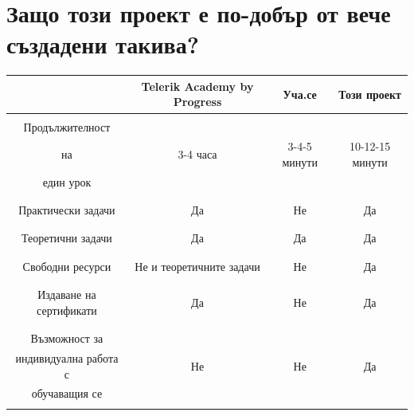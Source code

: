 \documentclass[12pt]{article}
\begin{document}
	\section{Защо този проект е по-добър от вече създадени такива?}
	\begin{table}[ht]
		\centering
		\resizebox{\textwidth}{!}
		{
			\begin{tabular}{c|c|c|c}
				& \foreignlanguage{english}{Telerik Academy by Progress} & Уча.се & Този проект\\
				\hline
				& & &\\
				Продължителност & & & \\ 
				на & 3-4 часа & 3-4-5 минути & 10-12-15 минути \\ 
				един урок & & &\\
				& & &\\
				\hline
				& & &\\
				Практически задачи & Да & Не & Да \\ 
				& & &\\
				\hline
				& & &\\
				Теоретични задачи & Да & Да & Да \\ 
				& & &\\
				\hline
				& & &\\
				Свободни ресурси & Не и теоретичните задачи & Не & Да \\ 
				& & &\\
				\hline
				& & &\\
				Издаване на сертификати & Да & Не & Да \\
				& & &\\
				\hline
				& & &\\
				Възможност за & & & \\ 
				индивидуална работа с & Не & Не & Да \\
				обучаващия се & & &\\ 
				& & &\\
				\hline
				
				
			\end{tabular}
		}
	\end{table}
	\newpage
\end{document}
